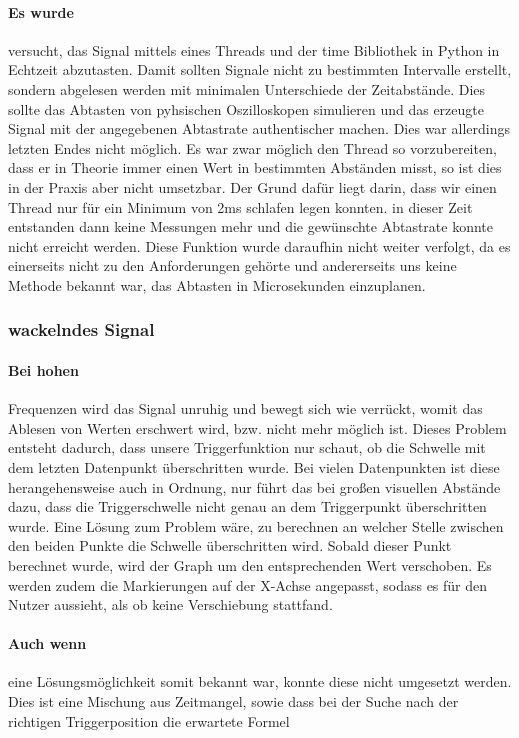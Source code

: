 \documentclass{article}
\begin{document}
\paragraph{Es wurde}
versucht, das Signal mittels eines Threads und der time Bibliothek in Python in Echtzeit abzutasten. Damit sollten Signale nicht zu bestimmten Intervalle erstellt, sondern abgelesen werden mit minimalen Unterschiede der Zeitabstände. Dies sollte das Abtasten von pyhsischen Oszilloskopen simulieren und das erzeugte Signal mit der angegebenen Abtastrate authentischer machen.
Dies war allerdings letzten Endes nicht möglich. Es war zwar möglich den Thread so vorzubereiten, dass er in Theorie immer einen Wert in bestimmten Abständen misst, so ist dies in der Praxis aber nicht umsetzbar. Der Grund dafür liegt darin, dass wir einen Thread nur für ein Minimum von 2ms schlafen legen konnten. in dieser Zeit entstanden dann keine Messungen mehr und die gewünschte Abtastrate konnte nicht erreicht werden. Diese Funktion wurde daraufhin nicht weiter verfolgt, da es einerseits nicht zu den Anforderungen gehörte und andererseits uns keine Methode bekannt war, das Abtasten in Microsekunden einzuplanen.

\subsubsection{wackelndes Signal}
\paragraph{Bei hohen}
Frequenzen wird das Signal unruhig und bewegt sich wie verrückt, womit das Ablesen von Werten erschwert wird, bzw. nicht mehr möglich ist. Dieses Problem entsteht dadurch, dass unsere Triggerfunktion nur schaut, ob die Schwelle mit dem letzten Datenpunkt überschritten wurde. Bei vielen Datenpunkten ist diese herangehensweise auch in Ordnung, nur führt das bei großen visuellen Abstände dazu, dass die Triggerschwelle nicht genau an dem Triggerpunkt überschritten wurde. Eine Lösung zum Problem wäre, zu berechnen an welcher Stelle zwischen den beiden Punkte die Schwelle überschritten wird. Sobald dieser Punkt berechnet wurde, wird der Graph um den entsprechenden Wert verschoben. Es werden zudem die Markierungen auf der X-Achse angepasst, sodass es für den Nutzer aussieht, als ob keine Verschiebung stattfand.

\paragraph{Auch wenn}
eine Lösungsmöglichkeit somit bekannt war, konnte diese nicht umgesetzt werden. Dies ist eine Mischung aus Zeitmangel, sowie dass bei der Suche nach der richtigen Triggerposition die erwartete Formel
\newline
\end{document}
